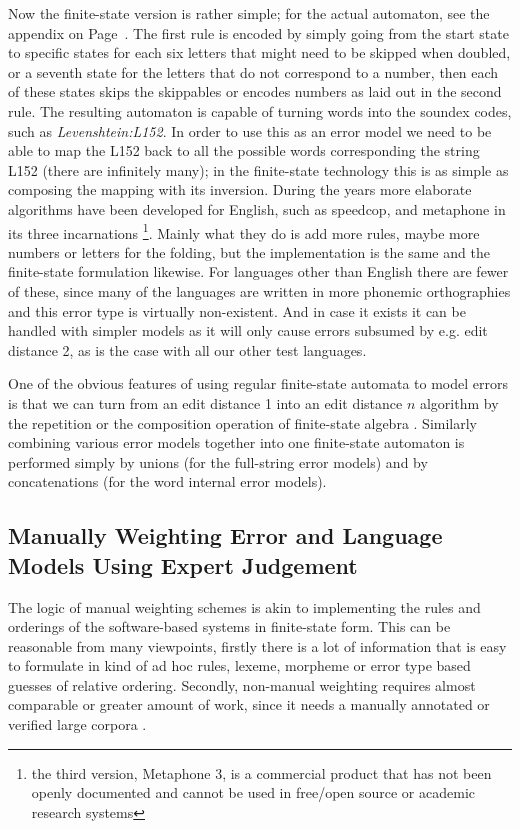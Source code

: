 \documentclass[a4paper,12pt]{article}
\begin{document}
Now the finite-state version is rather simple; for the actual automaton, see
the appendix on Page~\pageref{appendix:soundex}. The first rule is encoded by
simply going from the start state to specific states for each six letters that
might need to be skipped when doubled, or a seventh state for the letters that
do not correspond to a number, then each of these states skips the skippables
or encodes numbers as laid out in the second rule. The resulting automaton is
capable of turning words into the soundex codes, such as
\emph{Levenshtein:L152}. In order to use this as an error model we need to be
able to map the L152 back to all the possible words corresponding the string
L152 (there are infinitely many); in the finite-state technology this is as
simple as composing the mapping with its inversion. During the years more
elaborate algorithms have been developed for English, such as speedcop, and
metaphone in its three incarnations
\cite[]{philips1990hanging,philips2000double}\footnote{the third version,
Metaphone 3, is a commercial product that has not been openly documented and
cannot be used in free/open source or academic research systems}. Mainly what
they do is add more rules, maybe more numbers or letters for the folding, but
the implementation is the same and the finite-state formulation likewise. For
languages other than English there are fewer of these, since many of the
languages are written in more phonemic orthographies and this error type is
virtually non-existent. And in case it exists it can be handled with
simpler models as it will only cause errors subsumed by e.g. edit distance 2,
as is the case with all our other test languages.

One of the obvious features of using regular finite-state automata to model
errors is that we can turn from an edit distance 1 into an edit distance $n$
algorithm by the repetition or the composition operation of finite-state
algebra \cite[]{pirinen2012effects}.  Similarly combining various error models
together into one finite-state automaton is performed simply by unions (for the
full-string error models) and by concatenations (for the word internal error
models).

\subsection{Manually Weighting Error and Language Models Using Expert
Judgement}
\label{subsec:manual-weighting}

The logic of manual weighting schemes is akin to implementing the rules and
orderings of the software-based systems in finite-state form. This can be
reasonable from many viewpoints, firstly there is a lot of information that
is easy to formulate in kind of ad hoc rules, lexeme, morpheme or error
type based guesses of relative ordering. Secondly, non-manual weighting
requires almost comparable or greater amount of work, since it needs a
manually annotated or verified large corpora .
\end{document}
